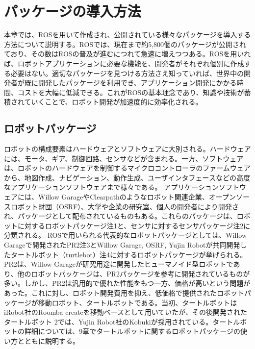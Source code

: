 
\chapter{パッケージの導入方法}

本章では、ROSを用いて作成され、公開されている様々なパッケージを導入する方法について説明する。ROSでは、現在まで約5,800個のパッケージが公開されており、その数はROSの普及が進むにつれて急速に増えつつある。ROSを用いれば、ロボットアプリケーションに必要な機能を、開発者がそれぞれ個別に作成する必要はない。適切なパッケージを見つける方法さえ知っていれば、世界中の開発者が既に開発したパッケージを利用でき、アプリケーション開発にかかる時間、コストを大幅に低減できる。これがROSの基本理念であり、知識や技術が蓄積されていくことで、ロボット開発が加速度的に効率化される。

\section{ロボットパッケージ}

ロボットの構成要素はハードウェアとソフトウェアに大別される。ハードウェアには、モータ、ギア、制御回路、センサなどが含まれる。一方、ソフトウェアは、ロボットのハードウェアを制御するマイクロコントローラのファームウェアから、地図作成、ナビゲーション、動作生成、ユーザインタフェースなどの高度なアプリケーションソフトウェアまで様々である。
アプリケーションソフトウェアには、Willow GarageやClearpathのようなロボット関連企業、オープンソースロボット財団（OSRF）、大学や企業の研究室、個人の開発者により開発され、パッケージとして配布されているものもある。これらのパッケージは、ロボットに対するロボットパッケージ注1と、センサに対するセンサパッケージ注2に分類される。
ROSで用いられる代表的なロボットパッケージとしては、Willow Garageで開発されたPR2注3とWillow Garage, OSRF, Yujin Robotが共同開発したタートルボット（turtlebot）注4に対するロボットパッケージが挙げられる。PR2は、Willow Garageが研究用途に開発したヒューマノイド型ロボットであり、他のロボットパッケージは、PR2パッケージを参考に開発されているものが多い。しかし、PR2は汎用的で優れた性能をもつ一方、価格が高いという問題があった。これに対し、ロボット開発費用を抑え、低価格で提供されたロボットパッケージが移動ロボット、タートルボットである。当初、タートルボットはiRobot社のRoomba createを移動ベースとして用いていたが、その後開発されたタートルボット 2では、Yujin Robot社のKobukiが採用されている。タートルボットの詳細については、9章でタートルボットに関するロボットパッケージの使い方とともに説明する。



